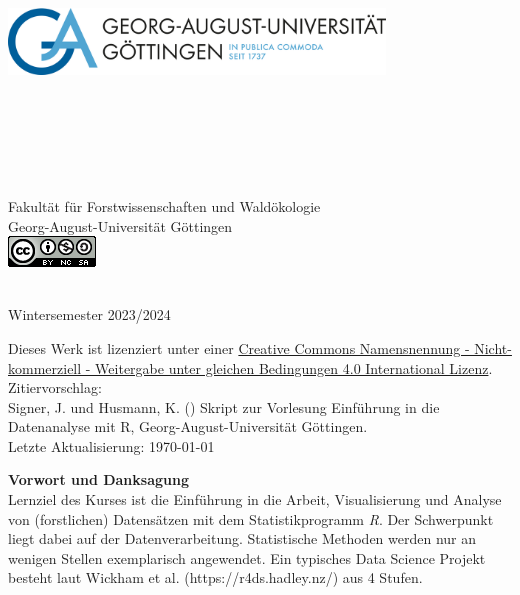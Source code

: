 \begin{titlepage}
\begin{center}
\vfill
\includegraphics[width=10cm,height=8cm]{misc/fig/logo-uni-neu.png}
~\\[0.4cm]

Fakultät für Forstwissenschaften und Waldökologie \\
Georg-August-Universität Göttingen \\[1.2cm]
\includegraphics{misc/fig/logo_cc.png}
\vfill

\hRule ~\\[0.5cm]
{\large Wintersemester 2023/2024}\\


\end{center}
\newpage
\vspace*{\fill}
Dieses Werk ist lizenziert unter einer \href{https://creativecommons.org/licenses/by-nc-sa/4.0/}{Creative Commons Namensnennung - Nicht-kommerziell - Weitergabe unter gleichen Bedingungen 4.0 International Lizenz}. \\[1cm]
Zitiervorschlag: \\
Signer, J. und Husmann, K. (\the\year{}) Skript zur Vorlesung Einführung in die Datenanalyse mit R, Georg-August-Universität Göttingen.
~\\[1cm]
Letzte Aktualisierung: \today

\newpage

{\bf Vorwort und Danksagung} \\[0.5cm]

Lernziel des Kurses ist die Einführung in die Arbeit, Visualisierung und Analyse von (forstlichen) Datensätzen
mit dem Statistikprogramm \textit{R}. Der Schwerpunkt liegt dabei auf der Datenverarbeitung. Statistische Methoden werden nur an wenigen Stellen exemplarisch angewendet. Ein typisches Data Science Projekt besteht laut Wickham et al. (https://r4ds.hadley.nz/) aus 4 Stufen.


\end{titlepage}

